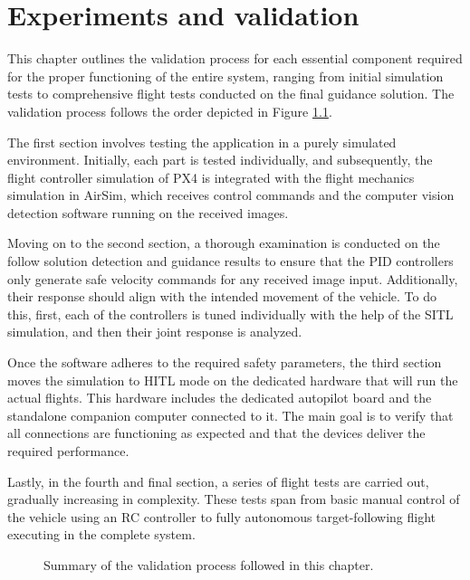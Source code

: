 \chapter{Experiments and validation}
\label{chap:validation}

This chapter outlines the validation process for each essential component required for the proper functioning of the entire system, ranging from initial simulation tests to comprehensive flight tests conducted on the final guidance solution. The validation process follows the order depicted in Figure \ref{fig:validation-chart}.

The first section involves testing the application in a purely simulated environment. Initially, each part is tested individually, and subsequently, the flight controller simulation of PX4 is integrated with the flight mechanics simulation in AirSim, which receives control commands and the computer vision detection software running on the received images.

Moving on to the second section, a thorough examination is conducted on the follow solution detection and guidance results to ensure that the PID controllers only generate safe velocity commands for any received image input. Additionally, their response should align with the intended movement of the vehicle. To do this, first, each of the controllers is tuned individually with the help of the SITL simulation, and then their joint response is analyzed.

Once the software adheres to the required safety parameters, the third section moves the simulation to HITL mode on the dedicated hardware that will run the actual flights. This hardware includes the dedicated autopilot board and the standalone companion computer connected to it. The main goal is to verify that all connections are functioning as expected and that the devices deliver the required performance.

Lastly, in the fourth and final section, a series of flight tests are carried out, gradually increasing in complexity. These tests span from basic manual control of the vehicle using an RC controller to fully autonomous target-following flight executing in the complete system.

\begin{figure}
  \centering
  \caption{Summary of the validation process followed in this chapter.}\label{fig:validation-chart}
\end{figure}





